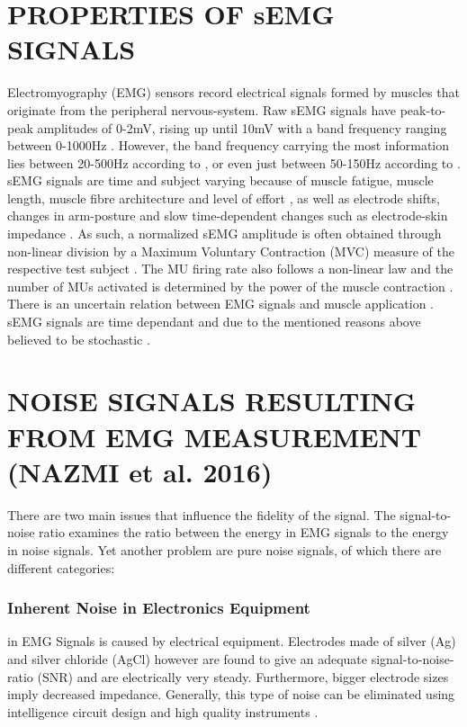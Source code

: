 \documentclass{article}
\begin{document}


\section{PROPERTIES OF sEMG SIGNALS}
Electromyography (EMG) sensors record electrical signals formed by muscles that originate from the peripheral nervous-system. Raw sEMG signals have peak-to-peak amplitudes of 0-2mV, rising up until 10mV \cite{Sulaiman2016} with a band frequency ranging between 0-1000Hz \cite{Soderberg1984}. However, the band frequency carrying the most information lies between 20-500Hz according to \cite{Boxtel2001} \cite{Kim2016}, or even just between 50-150Hz according to \cite{Sulaiman2016}. 
sEMG signals are time and subject varying because of muscle fatigue, muscle length, muscle fibre architecture and level of effort \cite{Kim2016} \cite{Nazmi2016}, as well as electrode shifts, changes in arm-posture and slow time-dependent changes such as electrode-skin impedance \cite{Castellini2009} \cite{Farina2014}. As such, a normalized sEMG amplitude is often obtained through non-linear division by a Maximum Voluntary Contraction (MVC) measure of the respective test subject \cite{Boccia2015} \cite{Martinez-Valdes2016}. The MU firing rate also follows a non-linear law \cite{Luca2010} and the number of MUs activated is determined by the power of the muscle contraction \cite{Piccoli2014}. 
There is an uncertain relation between EMG signals and muscle application \cite{Dieterich2017}. sEMG signals are time dependant \cite{Kim2016} and due to the mentioned reasons above believed to be stochastic \cite{Poo2010} \cite{Rogers2013}\cite{Thongpanja2013} \cite{Clancy1999}. 

\section{NOISE SIGNALS RESULTING FROM EMG MEASUREMENT (NAZMI et al. 2016)}
There are two main issues that influence the fidelity of the signal. The signal-to-noise ratio examines the ratio between the energy in EMG signals to the energy in noise signals. Yet another problem are pure noise signals, of which there are different categories:

\subsubsection{Inherent Noise in Electronics Equipment} in EMG Signals is caused by electrical equipment. Electrodes made of silver (Ag) and silver chloride (AgCl) however are found to give an adequate signal-to-noise-ratio (SNR) and are electrically very steady. Furthermore, bigger electrode sizes imply decreased impedance. Generally, this type of noise can be eliminated using intelligence circuit design and high quality instruments \cite{Nazmi2016}. 
\end{document}

